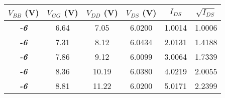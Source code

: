 \begin{tabular}{@{}cccccc@{}}
\toprule
\textbf{$V_{BB}$ (V)} & \multicolumn{1}{l}{\textbf{$V_{GG}$ (V)}} & \textbf{$V_{DD}$ (V)} & \textbf{$V_{DS}$ (V)} & \textbf{$I_{DS}$} & \textbf{$\sqrt{I_{DS}}$} \\ \midrule
\textit{\textbf{-6}}     &  6.64     & 7.05      & 6.0200      &1.0014   & 1.0006    \\
\textit{\textbf{-6}}     &  7.31     & 8.12      & 6.0434       & 2.0131 & 1.4188       \\
\textit{\textbf{-6}}     &  7.86     & 9.12      & 6.0099      & 3.0064  & 1.7339      \\
\textit{\textbf{-6}}     &  8.36     & 10.19      & 6.0380       & 4.0219 &2.0055       \\
\textit{\textbf{-6}}     &  8.81     & 11.22      & 6.0200      & 5.0171 & 2.2399      \\ \bottomrule
\end{tabular}